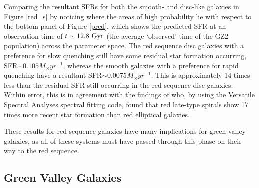 \documentclass[useAMS,usenatbib]{mn2e}
\def\changed    {\color{titlecol} }
\begin{document}
Comparing the resultant SFRs for both the smooth- and disc-like galaxies in Figure \ref{red_s} by noticing {\changed where the areas of high probability lie with respect to the bottom panel of Figure \ref{pred}, which shows the predicted SFR at an observation time of $t\sim12.8~\rm{Gyr}$ (the average `observed' time of the GZ2 population) across the parameter space}. The red sequence disc galaxies with a preference for slow quenching still have some residual star formation occurring, SFR$\sim0.105 M_{\odot}yr^{-1}$, whereas the smooth galaxies with a preference for rapid quenching have a resultant SFR$\sim0.0075 M_{\odot}yr^{-1}$. This is approximately 14 times less than the residual SFR still occurring in the red sequence disc galaxies. Within error, this is in agreement with the findings of \citet{Toj13} who, by using the Versatile Spectral Analyses spectral fitting code, found that red late-type spirals show 17 times more recent star formation than red elliptical galaxies.

These results for red sequence galaxies have many implications for green valley galaxies, as all of these systems must have passed through this phase on their way to the red sequence. %

\subsection{Green Valley Galaxies}\label{gv}
\end{document}
